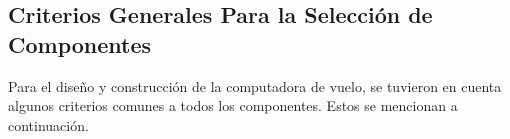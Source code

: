 





\subsection{Criterios Generales Para la Selección de Componentes}


Para el diseño y construcción de la computadora de vuelo, se tuvieron en cuenta algunos criterios comunes a todos los componentes. Estos se mencionan a continuación.


